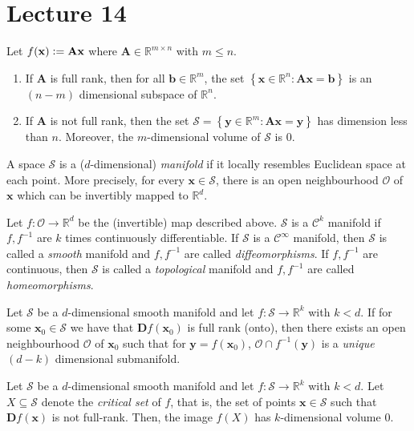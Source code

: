 \section{Lecture 14}

Let $f(\mathbf{x}) \vcentcolon= \mathbf{Ax}$ where $\mathbf{A} \in \mathbb{R}^{m \times n}$ with $m \leq n$. 

\begin{thm}
    \begin{enumerate}
        \item If $\mathbf{A}$ is full rank, then for all $\mathbf{b} \in \mathbb{R}^m$, the set $\left\{ \mathbf{x} \in \mathbb{R}^n \colon \mathbf{Ax} = \mathbf{b} \right\}$ is an $(n-m)$ dimensional subspace of $\mathbb{R}^n$. 

        \item If $\mathbf{A}$ is not full rank, then the set $\mathcal{S} = \left\{ \mathbf{y} \in \mathbb{R}^m \colon \mathbf{Ax} = \mathbf{y} \right\}$ has dimension less than $n$. Moreover, the $m$-dimensional volume of $\mathcal{S}$ is $0$. 
    \end{enumerate}
\end{thm}

\begin{defn}[Manifold]
    A space $\mathcal{S}$ is a ($d$-dimensional) \emph{manifold} if it locally resembles Euclidean space at each point. More precisely, for every $\mathbf{x} \in \mathcal{S}$, there is an open neighbourhood $\mathcal{O}$ of $\mathbf{x}$ which can be invertibly mapped to $\mathbb{R}^d$. 
\end{defn}

Let $f \colon \mathcal{O} \to \mathbb{R}^d$ be the (invertible) map described above. $\mathcal{S}$ is a $\mathcal{C}^k$ manifold if $f,f^{-1}$ are $k$ times continuously differentiable. If $\mathcal{S}$ is a $\mathcal{C}^{\infty}$ manifold, then $\mathcal{S}$ is called a \emph{smooth} manifold and $f,f^{-1}$ are called \emph{diffeomorphisms}. If $f,f^{-1}$ are continuous, then $\mathcal{S}$ is called a \emph{topological} manifold and $f,f^{-1}$ are called \emph{homeomorphisms}.

\begin{thm}
    Let $\mathcal{S}$ be a $d$-dimensional smooth manifold and let $f \colon \mathcal{S} \to \mathbb{R}^k$ with $k < d$. If for some $\mathbf{x}_0 \in \mathcal{S}$ we have that $\mathbf{D}f(\mathbf{x}_0)$ is full rank (onto), then there exists an open neighbourhood $\mathcal{O}$ of $\mathbf{x}_0$ such that for $\mathbf{y} = f(\mathbf{x}_0)$, $\mathcal{O} \cap f^{-1}(\mathbf{y})$ is a \emph{unique} $(d-k)$ dimensional submanifold. 
\end{thm}

\begin{thm}
    Let $\mathcal{S}$ be a $d$-dimensional smooth manifold and let $f \colon \mathcal{S} \to \mathbb{R}^k$ with $k < d$. Let $X \subseteq \mathcal{S}$ denote the \emph{critical set} of $f$, that is, the set of points $\mathbf{x} \in \mathcal{S}$ such that $\mathbf{D}f(\mathbf{x})$ is not full-rank. Then, the image $f(X)$ has $k$-dimensional volume $0$. 
\end{thm}